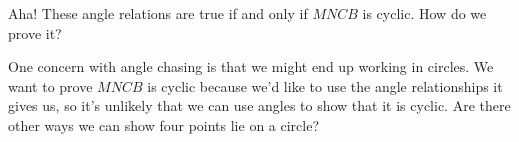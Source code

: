 












Aha! These angle relations are true if and only if $MNCB$ is cyclic. How do we prove it?

One concern with angle chasing is that we might end up working in circles. We want to prove $MNCB$ is cyclic because we'd like to use the angle relationships it gives us, so it's unlikely that we can use angles to show that it is cyclic. Are there other ways we can show four points lie on a circle?




